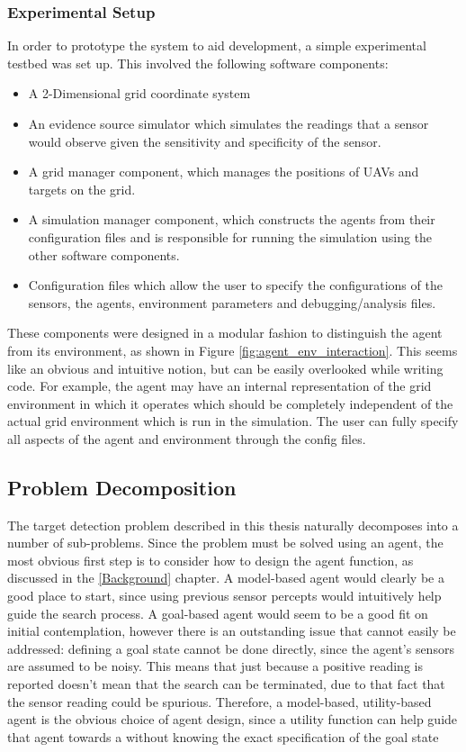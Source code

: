 \subsubsection{Experimental Setup}
In order to prototype the system to aid development, a simple experimental testbed was set up. This involved the following software components:
\begin{itemize}
    \item A 2-Dimensional grid coordinate system
    \item An evidence source simulator which simulates the readings that a sensor would observe given the sensitivity and specificity of the sensor.
    \item A grid manager component, which manages the positions of UAVs and targets on the grid.
    \item A simulation manager component, which constructs the agents from their configuration files and is responsible for running the simulation using the other software components.
    \item Configuration files which allow the user to specify the configurations of the sensors, the agents, environment parameters and debugging/analysis files.
\end{itemize}
These components were designed in a modular fashion to distinguish the agent from its environment, as shown in Figure \ref{fig:agent_env_interaction}. This seems like an obvious and intuitive notion, but can be easily overlooked while writing code. For example, the agent may have an internal representation of the grid environment in which it operates which should be completely independent of the actual grid environment which is run in the simulation. The user can fully specify all aspects of the agent and environment through the config files.

\subsection{Problem Decomposition}
The target detection problem described in this thesis naturally decomposes into a number of sub-problems. %
Since the problem must be solved using an agent, the most obvious first step is to consider how to design the agent function, as discussed in the \ref{Background} chapter. A model-based agent would clearly be a good place to start, since using previous sensor percepts would intuitively help guide the search process. A goal-based agent would seem to be a good fit on initial contemplation, however there is an outstanding issue that cannot easily be addressed: defining a goal state cannot be done directly, since the agent's sensors are assumed to be noisy. This means that just because a positive reading is reported doesn't mean that the search can be terminated, due to that fact that the sensor reading could be spurious. Therefore, a model-based, utility-based agent is the obvious choice of agent design, since a utility function can help guide that agent towards a  without knowing the exact specification of the goal state

